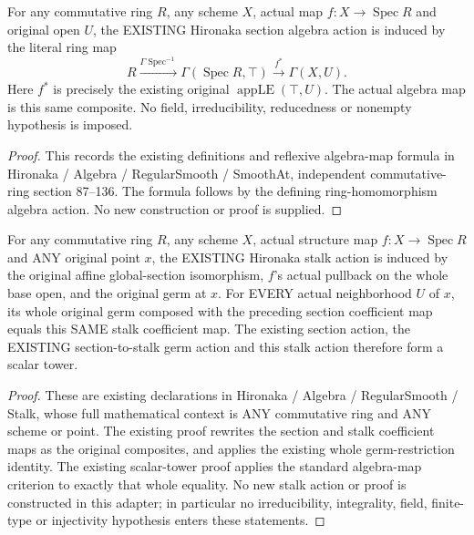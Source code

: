 \begin{definition}
\label{scheme:existing-hironaka-original-section-action}
\leanok
For any commutative ring $R$, any scheme $X$, actual map
$f:X\to\operatorname{Spec}R$ and original open $U$, the EXISTING Hironaka
section algebra action is induced by the literal ring map
\[
 R\xrightarrow{\Gamma\operatorname{Spec}^{-1}}\Gamma(\operatorname{Spec}R,\top)
 \xrightarrow{f^*}\Gamma(X,U).
\]
Here $f^*$ is precisely the existing original $\operatorname{appLE}(\top,U)$.
The actual algebra map is this same composite. No field, irreducibility,
reducedness or nonempty hypothesis is imposed.
\end{definition}
\begin{proof}
This records the existing definitions and reflexive algebra-map formula in
Hironaka / Algebra / RegularSmooth / SmoothAt, independent commutative-ring section
87--136. The formula follows by the defining ring-homomorphism algebra action.
No new construction or proof is supplied.
\end{proof}

\begin{definition}
\label{scheme:existing-hironaka-original-stalk-actions}
\leanok
For any commutative ring $R$, any scheme $X$, actual structure map
$f:X\to\operatorname{Spec}R$ and ANY original point $x$, the EXISTING Hironaka
stalk action is induced by the original affine global-section isomorphism,
$f$'s actual pullback on the whole base open, and the original germ at $x$.
For EVERY actual neighborhood $U$ of $x$, its whole original germ composed
with the preceding section coefficient map equals this SAME stalk
coefficient map. The existing section action, the EXISTING section-to-stalk
germ action and this stalk action therefore form a scalar tower.
\end{definition}
\begin{proof}
These are existing declarations in Hironaka / Algebra / RegularSmooth / Stalk,
whose full mathematical context is ANY commutative ring and ANY scheme or
point. The existing proof rewrites the section and stalk coefficient maps
as the original composites, and applies the existing whole germ-restriction
identity. The existing scalar-tower proof applies the standard algebra-map
criterion to exactly that whole equality. No new stalk action or proof is
constructed in this adapter; in particular no irreducibility, integrality,
field, finite-type or injectivity hypothesis enters these statements.
\end{proof}
